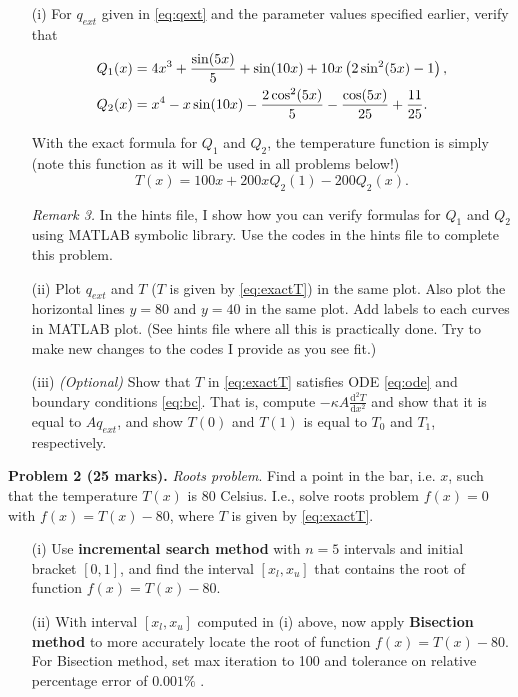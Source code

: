 \documentclass[11pt,a4paper]{report}
\newcommand{\dd}{\mathrm{d}}
\begin{document}
\begin{itemize}
\item[(i)] For $q_{ext}$ given in \eqref{eq:qext} and the parameter values specified earlier, verify that 
\begin{align}\label{eq:sol}
Q_1(x) &= 4 x^3 + \frac{\sin(5x)}{5} + \sin(10x) + 10x\left(2 \sin^2(5x) - 1\right), \notag \\
Q_2(x) &= x^4 - x \sin(10x) - \frac{2 \cos^2(5x)}{5} - \frac{\cos(5x)}{25} + \frac{11}{25}.
\end{align}

With the exact formula for $Q_1$ and $Q_2$, the temperature function is simply (note this function as it will be used in all problems below!)
\begin{equation}\label{eq:exactT}
T(x) = 100 x + 200 x Q_2(1) - 200 Q_2(x) .
\end{equation}

\noindent\textit{Remark 3.} In the hints file, I show how you can verify formulas for $Q_1$ and $Q_2$ using MATLAB symbolic library. Use the codes in the hints file to complete this problem.

\item[(ii)] Plot $q_{ext}$ and $T$ ($T$ is given by \eqref{eq:exactT}) in the same plot. Also plot the horizontal lines $y = 80$ and $y= 40$ in the same plot. Add labels to each curves in MATLAB plot. (See hints file where all this is practically done. Try to make new changes to the codes I provide as you see fit.)

\item[(iii)] \textit{(Optional)} Show that $T$ in \eqref{eq:exactT} satisfies ODE \eqref{eq:ode} and boundary conditions \eqref{eq:bc}. That is, compute $-\kappa A\frac{\dd^2 T}{\dd x^2}$ and show that it is equal to $A q_{ext}$, and show $T(0)$ and $T(1)$ is equal to $T_0$ and $T_1$, respectively.

\end{itemize}

\vspace{10pt}
\noindent\textbf{Problem 2 (25 marks).} \textit{Roots problem}. Find a point in the bar, i.e. $x$, such that the temperature $T(x)$ is 80 Celsius. I.e., solve roots problem $f(x) = 0$ with $f(x) = T(x) - 80$, where $T$ is given by \eqref{eq:exactT}. 
\begin{itemize}
  \item[(i)] Use \textbf{incremental search method} with $n  = 5$ intervals and initial bracket $[0,1]$, and find the interval $[x_l, x_u]$ that contains the root of function $f(x) = T(x) - 80$. 
  
  \item[(ii)] With interval $[x_l, x_u]$ computed in (i) above, now apply \textbf{Bisection method} to more accurately locate the root of function $f(x) = T(x) - 80$. For Bisection method, set max iteration to 100 and tolerance on relative percentage error of $0.001\%$ . 
\end{itemize}
\end{document}
